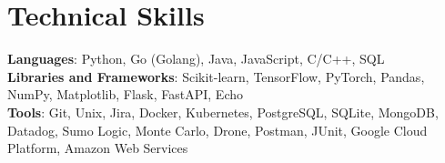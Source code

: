 \documentclass[letterpaper,11pt]{article}
\begin{document}
\section{Technical Skills}
 \begin{itemize}[leftmargin=0.15in, label={}]
    \small{\item{
     \textbf{Languages}{: Python, Go (Golang), Java, JavaScript, C/C++, SQL} \vspace{1.5pt}\\
     \textbf{Libraries and Frameworks}{: Scikit-learn, TensorFlow, PyTorch, Pandas, NumPy, Matplotlib, Flask, FastAPI, Echo} \vspace{1.5pt}\\
     \textbf{Tools}{: Git, Unix, Jira, Docker, Kubernetes, PostgreSQL, SQLite, MongoDB, Datadog, Sumo Logic, Monte Carlo, Drone, Postman, JUnit, Google Cloud Platform, Amazon Web Services} \\
    }}
 \end{itemize}


\end{document}
